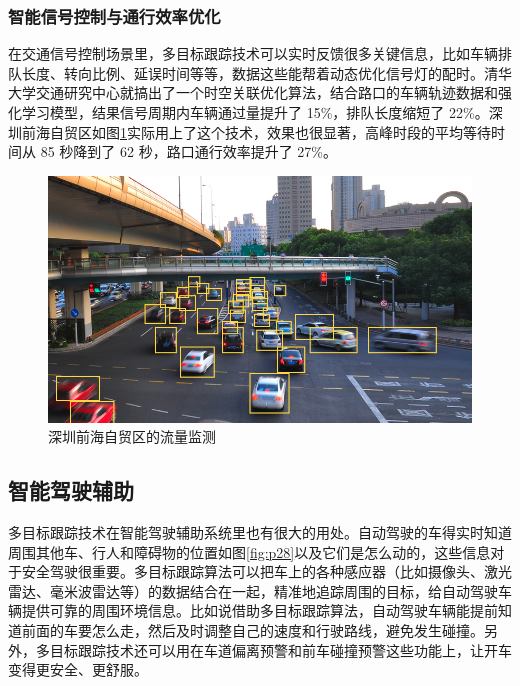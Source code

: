 \subsubsection{智能信号控制与通行效率优化}

在交通信号控制场景里，多目标跟踪技术可以实时反馈很多关键信息，比如车辆排队长度、转向比例、延误时间等等，数据这些能帮着动态优化信号灯的配时。清华大学交通研究中心\cite{qinghua2021optimization}就搞出了一个时空关联优化算法，结合路口的车辆轨迹数据和强化学习模型，结果信号周期内车辆通过量提升了 15\%，排队长度缩短了 22\%。深圳前海自贸区如图\ref{fig:p2}实际用上了这个技术，效果也很显著，高峰时段的平均等待时间从 85 秒降到了 62 秒，路口通行效率提升了 27\%。



\begin{figure}[htbp] %
	\centering
	\includegraphics[width=1\textwidth]{p2} %
	\caption{深圳前海自贸区的流量监测} %
	\label{fig:p2} %
\end{figure}


\subsection{智能驾驶辅助}

多目标跟踪技术在智能驾驶辅助系统里也有很大的用处。自动驾驶的车得实时知道周围其他车、行人和障碍物的位置如图\ref{fig:p28}以及它们是怎么动的，这些信息对于安全驾驶很重要。多目标跟踪算法可以把车上的各种感应器（比如摄像头、激光雷达、毫米波雷达等）的数据结合在一起，精准地追踪周围的目标，给自动驾驶车辆提供可靠的周围环境信息。比如说借助多目标跟踪算法，自动驾驶车辆能提前知道前面的车要怎么走，然后及时调整自己的速度和行驶路线，避免发生碰撞。另外，多目标跟踪技术还可以用在车道偏离预警和前车碰撞预警这些功能上，让开车变得更安全、更舒服。



